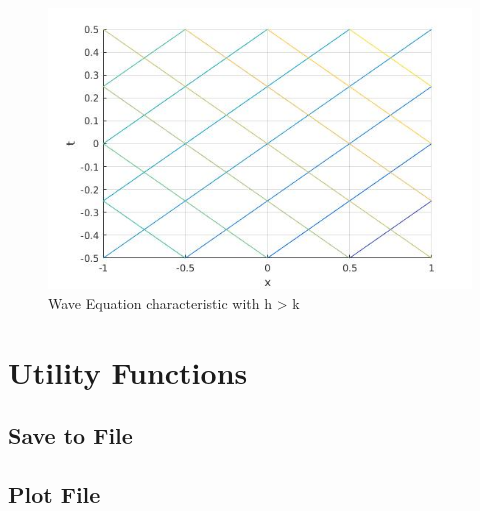 \begin{figure}[H]
 \includegraphics[width=\textwidth]{Images/wave_h>k.jpg}
 \caption{Wave Equation characteristic with h > k}
\end{figure}
\chapter{Utility Functions}
\section{Save to File} \label{stf}

\section{Plot File} \label{plotfile}


